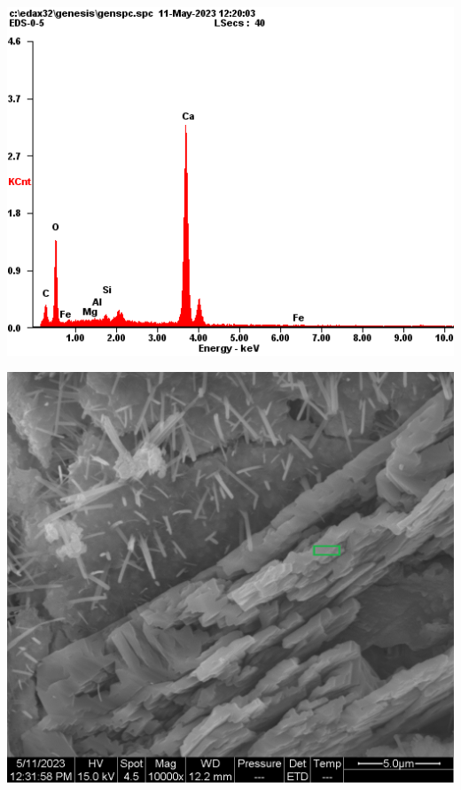 \begin{minipage}{\textwidth}
  \begin{minipage}[b]{0.32\textwidth}
    \centering
    \includegraphics[width = \linewidth]{assets/spectrum/00-05-10000x-ETD-CH.png}
  \end{minipage}
  \hfill
  \begin{minipage}[b]{0.32\textwidth}
    \centering
    \includegraphics[width = \linewidth]{assets/spectrum selection/00-05-10000x-ETD-CH.png}
    \label{fig:00-05-select}
  \end{minipage}
  \hfill
  \begin{minipage}[b]{0.32\textwidth}
    \centering
    \begin{tabular}{|c|c|c|}
      \hline
      

\end{tabular}
\end{minipage}
\end{minipage}
